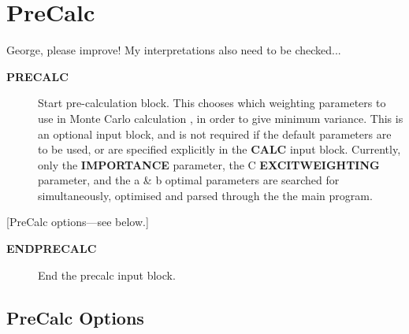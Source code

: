 \documentclass[openany,a4paper,10pt]{manual}
\begin{document}
\hypertarget{input-precalc}{}\section{PreCalc}

\begin{notice}[note]
George, please improve!  My interpretations also need to be checked...
\end{notice}
\begin{description}
\item[\textbf{PRECALC}]
Start pre-calculation block.  This chooses which weighting parameters
to use in Monte Carlo calculation , in order to give minimum variance.
This is an optional input block, and is not required if the default
parameters are to be used, or are specified explicitly in the \textbf{CALC}
input block.  Currently, only the \textbf{IMPORTANCE} parameter, the C
\textbf{EXCITWEIGHTING} parameter, and the a \& b optimal parameters are
searched for simultaneously, optimised and parsed through the the
main program.

\end{description}

{[}PreCalc options---see below.{]}
\begin{description}
\item[\textbf{ENDPRECALC}]
End the precalc input block.

\end{description}


\subsection{PreCalc Options}
\end{document}
